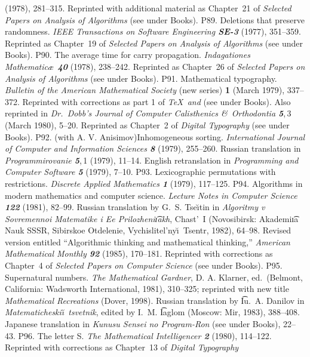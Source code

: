  (1978), 281--315.  
 Reprinted with additional material as Chapter~21 of {\sl Selected Papers
 on Analysis of Algorithms\/} (see under Books).
\p P89.  Deletions that preserve randomness.  {\sl IEEE Transactions on
 Software Engineering\/ \bf SE-3} (1977), 351--359.  
 Reprinted as Chapter~19 of {\sl Selected Papers on Analysis of Algorithms\/}
 (see under Books).
\p P90.  The average time for carry propagation. {\sl Indagationes 
 Mathematic\ae\ \bf 40} (1978), 238--242.
 Reprinted as Chapter~26 of {\sl Selected Papers on Analysis of Algorithms\/}
 (see under Books).
\p P91.  Mathematical typography.  {\sl Bulletin of the American
 Mathematical Society\/} (new series) {\bf 1} (March 1979), 337--372.
 Reprinted with corrections as part 1 of {\sl \TeX\ and \slMF\/}
 (see under Books). Also reprinted in {\sl Dr.\ Dobb's Journal of Computer
 Calisthenics \&\ Orthodontia\/ \bf 5},\,3 (March 1980), 5--20.
 Reprinted as Chapter~2 of {\sl Digital Typography\/} (see under Books).
\p P92.  (with A. V. Anisimov)\xskip  Inhomogeneous sorting.
 {\sl International Journal of Computer and Information Sciences\/ \bf 8}
 (1979), 255--260.  Russian translation in {\sl Programmirovanie\/ \bf 5},\,1
 (1979), 11--14. English retranslation in {\sl Programming and Computer
 Software\/ \bf 5} (1979), 7--10.
\p P93.  Lexicographic permutations with restrictions.  {\sl Discrete Applied
 Mathematics\/ \bf 1} (1979), 117--125.
\p P94.  Algorithms in modern mathematics and computer science.  {\sl Lecture
 Notes in Computer Science\/ \bf 122} (1981), 82--99.
 Russian translation by G.~S. Tse\u\i tin
 in {\sl Algoritmy v Sovremennoi Matematike i Ee
 Pri\-lozheni\t{\i}akh}, Chast'~I (Novosibirsk: Akademi\t{\i}a Nauk SSSR,
 Sibirskoe Otdelenie, Vychislitel'ny\u\i\ Tsentr, 1982), 64--98.
 Revised version entitled ``Algorithmic thinking and mathematical thinking,''
 {\sl American Mathematical Monthly\/ \bf 92} (1985), 170--181.
 Reprinted with corrections as Chapter~4 of {\sl Selected Papers on
 Computer Science\/} (see under Books).
\p P95.  Supernatural numbers.  {\sl The Mathematical Gardner}, D. A. Klarner,
 ed.\ (Belmont, California: Wads\-worth International, 1981), 310--325;
 reprinted with new title {\sl Mathematical Recreations\/} (Dover, 1998).
 Russian translation by \t Iu.~A. Danilov in {\sl Matematicheski\u\i\
 tsvetnik}, edited by I.~M. \t Iaglom (Moscow: Mir, 1983),
 388--408. Japanese translation in {\sl Kunusu Sensei no Program-Ron\/}
 (see under Books), 22--43.
\p P96. The letter S. {\sl The Mathematical Intelligencer\/ \bf 2} (1980),
 114--122.
 Reprinted with corrections as Chapter~13 of {\sl Digital Typography\/}
